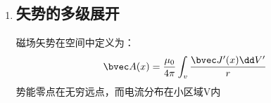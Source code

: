 \begin{enumerate}
\item \subsection{矢势的多级展开}
磁场矢势在空间中定义为：
\begin{equation}
\bvec A(x)=\dfrac {\mu_0}{4\pi} \int_v \dfrac{ \bvec J^{\prime}(x)\dd V^{\prime}}{r}
\end{equation}
势能零点在无穷远点，而电流分布在小区域V内
\end{enumerate}


